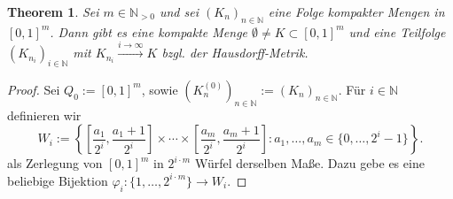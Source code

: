 \documentclass[a4paper,12pt]{article}
\theoremstyle{definition}
\theoremstyle{plain}
\newtheorem{theorem}{Theorem}
\def\N{\mathbb{N}}
\begin{document}
\begin{theorem}
  \label{thm:h-komp-01}
  Sei $m \in \N_{>0}$ und sei $(K_n)_{n \in \N}$ eine Folge kompakter Mengen in $[0,1]^m$. Dann gibt es eine kompakte Menge $\emptyset \neq K \subset [0,1]^m$ und eine Teilfolge $(K_{n_i})_{i \in \N}$ mit $K_{n_i} \xrightarrow{i \to \infty} K$ bzgl. der Hausdorff-Metrik.
\end{theorem}
\begin{proof}
  Sei $Q_0 := [0,1]^m$, sowie $(K^{(0)}_n)_{n \in \N} := (K_n)_{n \in \N}$.
  Für $i \in \N$ definieren wir
  \[
    W_i := \left\{ \left[\frac{a_1}{2^i}, \frac{a_1 + 1}{2^i}\right] \times \cdots \times \left[\frac{a_m}{2^i}, \frac{a_m + 1}{2^i}\right] : a_1, \ldots, a_m \in \{0, \ldots, 2^i - 1\}\right\}.
  \]
  als Zerlegung von $[0,1]^m$ in $2^{i \cdot m}$ Würfel derselben Maße. Dazu gebe es eine beliebige Bijektion $\varphi_i : \{1, \ldots, 2^{i \cdot m}\} \to W_i$.


\end{proof}
\end{document}
